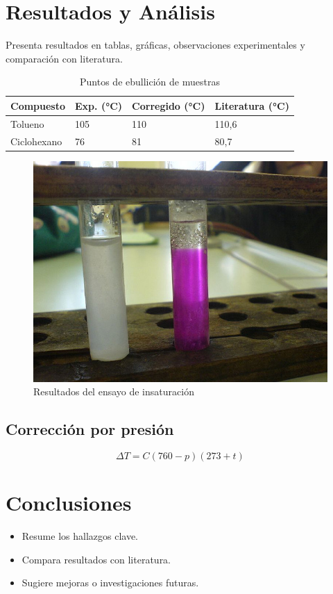 \documentclass[letterpaper,12pt]{article}
\numberwithin{equation}{section}      %
\begin{document}
	\section{Resultados y Análisis}
	Presenta resultados en tablas, gráficas, observaciones experimentales y comparación con literatura.
	
	\begin{table}[H]
		\centering
		\begin{tabularx}{0.95\textwidth}{X X X X}
			\toprule
			\textbf{Compuesto} & \textbf{Exp. (\si{\degreeCelsius})} & \textbf{Corregido (\si{\degreeCelsius})} & \textbf{Literatura (\si{\degreeCelsius})} \\
			\midrule
			Tolueno & 105 & 110 & 110,6 \\
			Ciclohexano & 76 & 81 & 80,7 \\
			\bottomrule
		\end{tabularx}
		\caption{Puntos de ebullición de muestras}
	\end{table}
	
	\begin{figure}[H]
		\centering
		\includegraphics[width=0.6\linewidth]{images/tubes.jpg}
		\caption{Resultados del ensayo de insaturación}
		\label{fig:tubes}
	\end{figure}
	
	\subsection{Corrección por presión}
	\begin{equation}
		\Delta T = C(760 - p)(273 + t)
		\label{eq:bpcorrection}
	\end{equation}
	
	\section{Conclusiones}
	\begin{itemize}
		\item Resume los hallazgos clave.
		\item Compara resultados con literatura.
		\item Sugiere mejoras o investigaciones futuras.
	\end{itemize}
	
\end{document}
